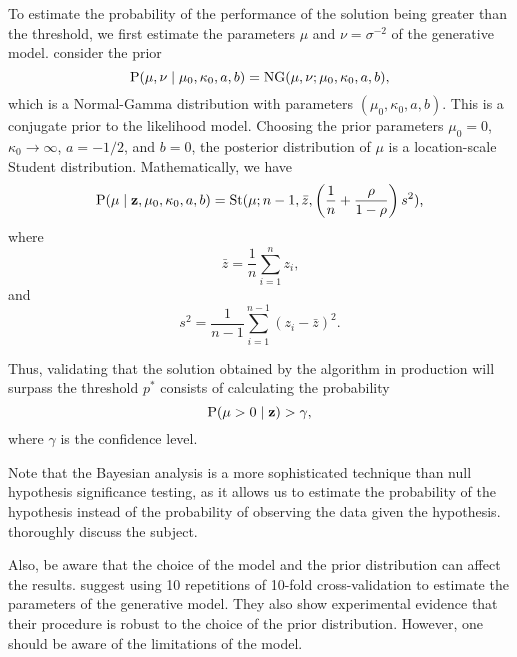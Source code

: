 To estimate the probability of the performance of the solution being greater than the
threshold, we first estimate the parameters $\mu$ and $\nu = \sigma^{-2}$ of the
generative model.  \citeauthor{Benavoli2017} consider the prior
\begin{equation*}
  \operatorname{P}(\mu, \nu \mid \mu_0, \kappa_0, a, b) = \operatorname{NG}(\mu, \nu; \mu_0, \kappa_0, a, b)\text{,}
\end{equation*}
which is a Normal-Gamma distribution with parameters $(\mu_0, \kappa_0, a, b)$.  This is a
conjugate prior to the likelihood model.  Choosing the prior parameters $\mu_0 = 0$,
$\kappa_0 \to \infty$, $a = -1/2$, and $b = 0$, the posterior distribution of $\mu$ is a
location-scale Student distribution.  Mathematically, we have
\begin{equation*}
  \operatorname{P}(\mu \mid \mathbf{z}, \mu_0, \kappa_0, a, b) =
    \operatorname{St}(\mu; n - 1, \bar{z}, \left(
      \frac{1}{n} + \frac{\rho}{1 - \rho}
    \right)s^2)\text{,}
\end{equation*}
where
\begin{equation*}
  \bar{z} = \frac{1}{n} \sum_{i=1}^n z_i\text{,}
\end{equation*}
and
\begin{equation*}
  s^2 = \frac{1}{n - 1} \sum_{i=1}^{n-1} (z_i - \bar{z})^2\text{.}
\end{equation*}

Thus, validating that the solution obtained by the algorithm in production will surpass
the threshold $p^{*}$ consists of calculating the probability
\begin{equation*}
  \operatorname{P}(\mu > 0 \mid \mathbf{z}) > \gamma\text{,}
\end{equation*}
where $\gamma$ is the confidence level.

Note that the Bayesian analysis is a more sophisticated technique than null hypothesis
significance testing, as it allows us to estimate the probability of the hypothesis
instead of the probability of observing the data given the hypothesis.
\textcite{Benavoli2017} thoroughly discuss the subject.

Also, be aware that the choice of the model and the prior distribution can affect the
results.  \citeauthor{Benavoli2017} suggest using 10 repetitions of 10-fold cross-validation
to estimate the parameters of the generative model.  They also show experimental evidence
that their procedure is robust to the choice of the prior distribution.  However, one
should be aware of the limitations of the model.

